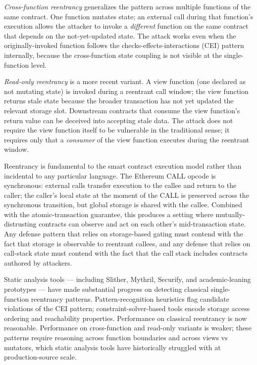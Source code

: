 \emph{Cross-function reentrancy} generalizes the pattern across multiple
functions of the same contract. One function mutates state; an external
call during that function's execution allows the attacker to invoke a
\emph{different} function on the same contract that depends on the
not-yet-updated state. The attack works even when the originally-invoked
function follows the checks-effects-interactions (CEI) pattern
internally, because the cross-function state coupling is not visible at
the single-function level.

\emph{Read-only reentrancy} is a more recent variant. A view function
(one declared as not mutating state) is invoked during a reentrant call
window; the view function returns stale state because the broader
transaction has not yet updated the relevant storage slot. Downstream
contracts that consume the view function's return value can be deceived
into accepting stale data. The attack does not require the view function
itself to be vulnerable in the traditional sense; it requires only that
a \emph{consumer} of the view function executes during the reentrant
window.

Reentrancy is fundamental to the smart contract execution model rather
than incidental to any particular language. The Ethereum CALL opcode is
synchronous: external calls transfer execution to the callee and return
to the caller; the caller's local state at the moment of the CALL is
preserved across the synchronous transition, but global storage is
shared with the callee. Combined with the atomic-transaction guarantee,
this produces a setting where mutually-distrusting contracts can observe
and act on each other's mid-transaction state. Any defense pattern that
relies on storage-based gating must contend with the fact that storage
is observable to reentrant callees, and any defense that relies on
call-stack state must contend with the fact that the call stack includes
contracts authored by attackers.

Static analysis tools --- including Slither, Mythril, Securify, and
academic-leaning prototypes --- have made substantial progress on
detecting classical single-function reentrancy patterns.
Pattern-recognition heuristics flag candidate violations of the CEI
pattern; constraint-solver-based tools encode storage access ordering
and reachability properties. Performance on classical reentrancy is now
reasonable. Performance on cross-function and read-only variants is
weaker; these patterns require reasoning across function boundaries and
across views vs mutators, which static analysis tools have historically
struggled with at production-source scale.

